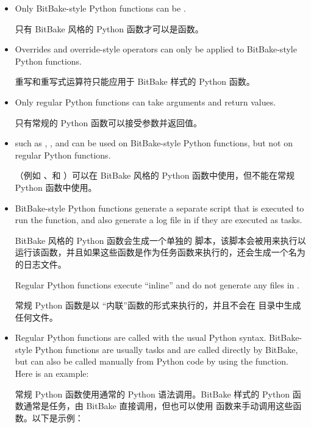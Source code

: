 \begin{itemize}
\setlength\itemsep{1.0em}
\item Only BitBake-style Python functions can be .

\medskip
只有 BitBake 风格的 Python 函数才可以是函数。

\item Overrides and override-style operators can only be applied to BitBake-style Python functions.

\medskip
重写和重写式运算符只能应用于 BitBake 样式的 Python 函数。

\item Only regular Python functions can take arguments and return values.

\medskip
只有常规的 Python 函数可以接受参数并返回值。

\item {} such as \code{[dirs]}, \code{[cleandirs]}, and \code{[lockfiles]} can be used on BitBake-style Python functions, but not on regular Python functions.

\medskip
{}（例如 \code{[dirs]}、\code{[cleandirs]}和 \code{[lockfiles]}）可以在 BitBake 风格的 Python 函数中使用，但不能在常规 Python 函数中使用。

\item BitBake-style Python functions generate a separate  script that is executed to run the function, and also generate a log file in  if they are executed as tasks.

\medskip
BitBake 风格的 Python 函数会生成一个单独的  脚本，该脚本会被用来执行以运行该函数，并且如果这些函数是作为任务函数来执行的，还会生成一个名为  的日志文件。

Regular Python functions execute ``inline'' and do not generate any files in .

常规 Python 函数是以 ``内联''函数的形式来执行的，并且不会在  目录中生成任何文件。

\item Regular Python functions are called with the usual Python syntax. BitBake-style Python functions are usually tasks and are called directly by BitBake, but can also be called manually from Python code by using the  function. Here is an example:

\medskip
常规 Python 函数使用通常的 Python 语法调用。BitBake 样式的 Python 函数通常是任务，由 BitBake 直接调用，但也可以使用  函数来手动调用这些函数。以下是示例：


\end{itemize}
